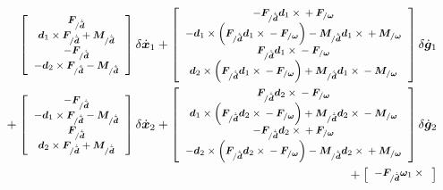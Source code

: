 \documentclass[10pt,fleqn,subeqn]{report}
\newcommand{\T}[1]{\bm{#1}}
\begin{document}
\begin{align}
	\footnotesize
	\sqbr{\matr{c}{
		\T{F}_{/\dot{\tilde{\T{d}}}} \\
		\T{d}_1 \times \T{F}_{/\dot{\tilde{\T{d}}}}
			+ \T{M}_{/\dot{\tilde{\T{d}}}} \\
		- \T{F}_{/\dot{\tilde{\T{d}}}} \\
		- \T{d}_2 \times \T{F}_{/\dot{\tilde{\T{d}}}}
			- \T{M}_{/\dot{\tilde{\T{d}}}}
	}} \delta\dot{\T{x}}_1
%
	+ \sqbr{\matr{c}{
		-\T{F}_{/\dot{\tilde{\T{d}}}} \T{d}_1\times{}
			+ \T{F}_{/\T{\omega}} \\
		- \T{d}_1 \times \plbr{
			\T{F}_{/\dot{\tilde{\T{d}}}} \T{d}_1\times{}
			- \T{F}_{/\T{\omega}}
		}
			- \T{M}_{/\dot{\tilde{\T{d}}}} \T{d}_1\times{}
			+ \T{M}_{/\T{\omega}} \\
		\T{F}_{/\dot{\tilde{\T{d}}}} \T{d}_1\times{}
			- \T{F}_{/\T{\omega}} \\
		\T{d}_2 \times \plbr{
			\T{F}_{/\dot{\tilde{\T{d}}}} \T{d}_1\times{}
			- \T{F}_{/\T{\omega}}
		}
			+ \T{M}_{/\dot{\tilde{\T{d}}}} \T{d}_1\times{}
			- \T{M}_{/\T{\omega}}
	}} \delta\dot{\T{g}}_1
	& \nonumber \\
%
	\footnotesize
	\mbox{}
	+ \sqbr{\matr{c}{
		- \T{F}_{/\dot{\tilde{\T{d}}}} \\
		- \T{d}_1 \times \T{F}_{/\dot{\tilde{\T{d}}}}
			- \T{M}_{/\dot{\tilde{\T{d}}}} \\
		\T{F}_{/\dot{\tilde{\T{d}}}} \\
		\T{d}_2 \times \T{F}_{/\dot{\tilde{\T{d}}}}
			+ \T{M}_{/\dot{\tilde{\T{d}}}}
	}} \delta\dot{\T{x}}_2
%
	+ \sqbr{\matr{c}{
		\T{F}_{/\dot{\tilde{\T{d}}}} \T{d}_2\times{}
			- \T{F}_{/\T{\omega}} \\
		\T{d}_1 \times \plbr{
			\T{F}_{/\dot{\tilde{\T{d}}}} \T{d}_2\times{}
			- \T{F}_{/\T{\omega}}
		}
			+ \T{M}_{/\dot{\tilde{\T{d}}}} \T{d}_2\times{}
			- \T{M}_{/\T{\omega}} \\
		- \T{F}_{/\dot{\tilde{\T{d}}}} \T{d}_2\times{}
			+ \T{F}_{/\T{\omega}} \\
		- \T{d}_2 \times \plbr{
			\T{F}_{/\dot{\tilde{\T{d}}}} \T{d}_2\times{}
			- \T{F}_{/\T{\omega}}
		}
			- \T{M}_{/\dot{\tilde{\T{d}}}} \T{d}_2\times{}
			+ \T{M}_{/\T{\omega}}
	}} \delta\dot{\T{g}}_2
	& \nonumber \\
%
%
%
	\footnotesize
	\mbox{} + \sqbr{\cvvect{
		- \T{F}_{/\dot{\tilde{\T{d}}}} \T{\omega}_1 \times{} \\
}}
\end{align}
\end{document}

